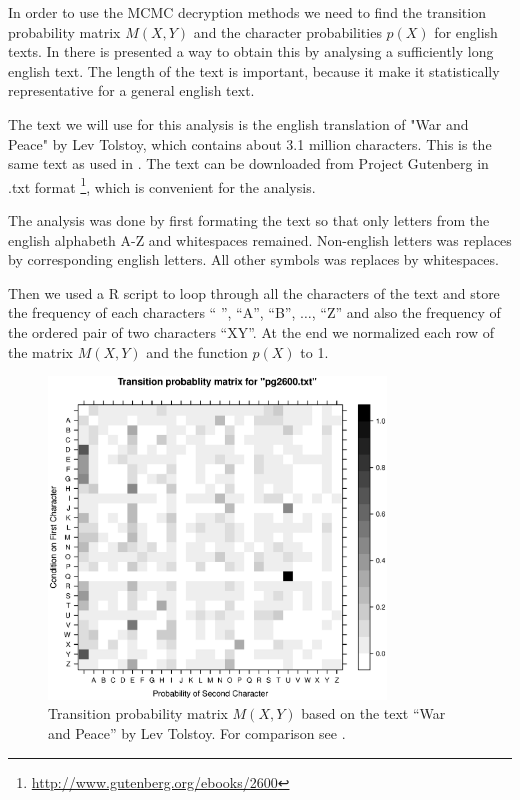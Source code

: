 \documentclass[a4paper, 11pt]{article}
\begin{document}
In order to use the MCMC decryption methods we need to find the transition
probability matrix $M(X,Y)$ and the character probabilities $p(X)$ for
english texts. In \cite{Landgraf} there is presented a way to obtain this by
analysing a sufficiently long english text. The length of the text is
important, because it make it statistically representative for a general
english text. 

The text we will use for this analysis is the english translation of 
"War and Peace" by Lev Tolstoy, which contains about 3.1 million characters. 
This is the same text as used in \cite{Landgraf}. The text can be downloaded
from Project Gutenberg in .txt format 
\footnote{\href{http://www.gutenberg.org/ebooks/2600}
{http://www.gutenberg.org/ebooks/2600}}, which is convenient for the analysis.

The analysis was done by first formating the text so that only letters from
the english alphabeth A-Z and whitespaces remained. Non-english letters was
replaces by corresponding english letters. All other symbols was replaces by
whitespaces.

Then we used a R script to loop through all the characters of the text
and store the frequency of each characters `` '', ``A'', ``B'', 
$\dots$, ``Z'' and also the frequency of the ordered pair of two 
characters ``XY''. At the end we normalized each row of the matrix $M(X,Y)$
and the function $p(X)$ to 1.

\begin{figure}[h]
  \centering
  \includegraphics[width=0.8\textwidth]{transprob_matrix-pg2600-.eps}
  \caption{Transition probability matrix $M(X,Y)$ based on the text
    ``War and Peace'' by Lev Tolstoy. For comparison see \cite{Landgraf}.}
  \label{fig:TransProbMat}
\end{figure}
\end{document}
